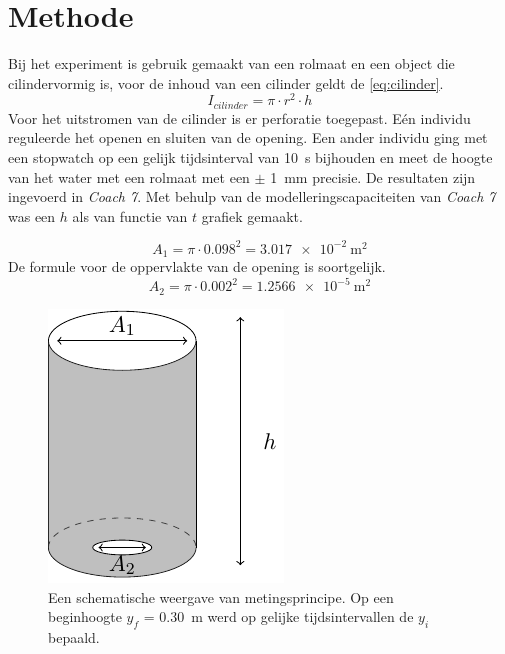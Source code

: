 \documentclass[numbers=endperiod]{scrartcl}
\begin{document}
\newpage
\section{Methode}
Bij het experiment is gebruik gemaakt van een rolmaat en een object die cilindervormig is, voor de inhoud van een cilinder geldt de \ref{eq:cilinder}. 
\begin{equation}\label{eq:cilinder}
    I_{cilinder} = \pi \cdot r^2 \cdot h
\end{equation}
Voor het uitstromen van de cilinder is er perforatie toegepast. Eén individu reguleerde het openen en sluiten van de opening. Een ander individu ging met een stopwatch op een gelijk tijdsinterval van \SI{10}{\second} bijhouden en meet de hoogte van het water met een rolmaat met een $\pm$ \SI{1}{\milli\meter} precisie. De resultaten zijn ingevoerd in \textit{Coach 7}. Met behulp van de modelleringscapaciteiten van \textit{Coach 7} was een $h$ als van functie van $t$ grafiek gemaakt.  






\begin{equation}
    A_1 = \pi \cdot 0.098^2 = \SI{3.017e-2}{\meter\squared}
\end{equation}
 De formule voor de oppervlakte van de opening is soortgelijk.
\begin{equation}
    A_2 = \pi \cdot 0.002^2 = \SI{1.2566e-5}{\meter\squared}
\end{equation}

\begin{figure}[ht]
\centering
\caption{Een schematische weergave van metingsprincipe. Op een beginhoogte $y_f$ = \SI{0.30}{\meter} werd op gelijke tijdsintervallen de $y_i$ bepaald.}
\includegraphics[scale=0.8]{Beker.pdf}    
\end{figure}
\end{document}
